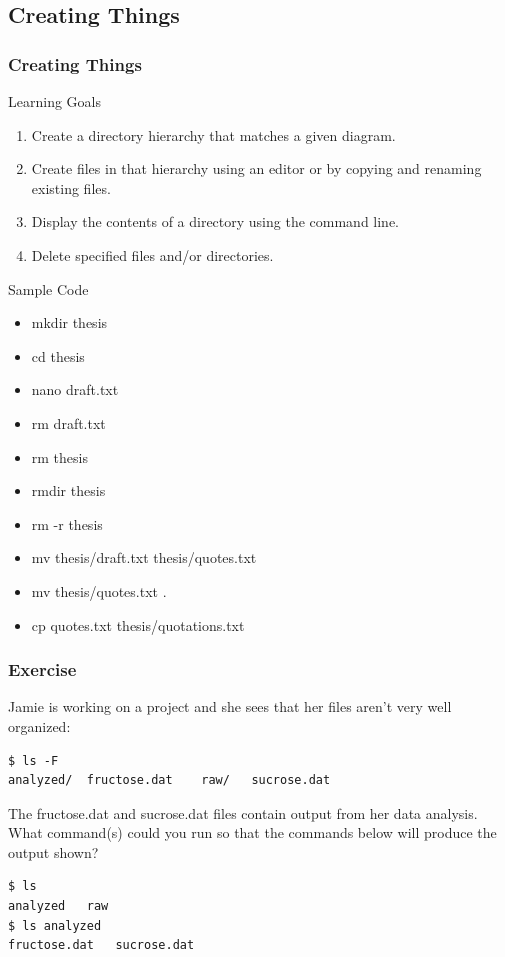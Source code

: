 \documentclass{beamer}
\begin{document}
\subsection*{Creating Things}
\begin{frame}
\frametitle{Creating Things}
\small{
\begin{block}{Learning Goals}

\begin{enumerate}
\item    Create a directory hierarchy that matches a given diagram.
\item    Create files in that hierarchy using an editor or by copying and renaming existing files.
\item    Display the contents of a directory using the command line.
\item    Delete specified files and/or directories.
\end{enumerate}
\end{block}
\begin{block}{Sample Code}
\begin{multicols}{2}
\begin{itemize}
\item mkdir thesis
\item cd thesis
\item nano draft.txt
\item rm draft.txt
\item rm thesis
\item rmdir thesis
\item rm -r thesis
\item mv thesis/draft.txt thesis/quotes.txt
\item mv thesis/quotes.txt .
\item cp quotes.txt thesis/quotations.txt
\end{itemize}
\end{multicols}
\end{block}}
\end{frame}


\begin{frame}[fragile]
\frametitle{Exercise}
Jamie is working on a project and she sees that her files aren’t very well organized:
\begin{verbatim}
$ ls -F
analyzed/  fructose.dat    raw/   sucrose.dat
\end{verbatim}
The fructose.dat and sucrose.dat files contain output from her data analysis. 
What command(s) could you run so that the commands below will produce the output shown? 
\begin{verbatim}
$ ls
analyzed   raw
$ ls analyzed
fructose.dat   sucrose.dat
\end{verbatim}
\end{frame}
\end{document}
